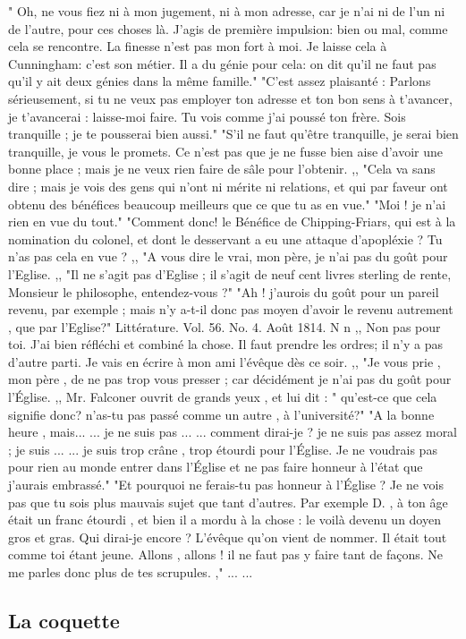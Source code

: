 " Oh, ne vous fiez ni à mon jugement, ni à mon adresse, car je n'ai ni de l'un ni de l'autre, pour ces choses là. J'agis de première impulsion: bien ou mal, comme cela se rencontre. La finesse n'est pas mon fort à moi. Je laisse cela à Cunningham: c'est son métier. Il a du génie pour cela: on dit qu'il ne faut pas qu'il y ait deux génies dans la même famille."
\setcounter{page}{525} "C'est assez plaisanté : Parlons sérieusement, si tu ne veux pas employer ton adresse et ton bon sens à t'avancer, je t'avancerai : laisse-moi faire. Tu vois comme j'ai poussé ton frère. Sois tranquille ; je te pousserai bien aussi."
"S'il ne faut qu'être tranquille, je serai bien tranquille, je vous le promets. Ce n'est pas que je ne fusse bien aise d'avoir une bonne place ; mais je ne veux rien faire de sâle pour l'obtenir. ,,
"Cela va sans dire ; mais je vois des gens qui n'ont ni mérite ni relations, et qui par faveur ont obtenu des bénéfices beaucoup meilleurs que ce que tu as en vue."
"Moi ! je n'ai rien en vue du tout."
"Comment donc! le Bénéfice de Chipping-Friars, qui est à la nomination du colonel, et dont le desservant a eu une attaque d'apopléxie ? Tu n'as pas cela en vue ? ,,
"A vous dire le vrai, mon père, je n'ai pas du goût pour l'Eglise. ,,
"Il ne s'agit pas d'Eglise ; il s'agit de neuf cent livres sterling de rente, Monsieur le philosophe, entendez-vous ?"
"Ah ! j'aurois du goût pour un pareil revenu, par exemple ; mais n'y a-t-il donc pas moyen d'avoir le revenu autrement , que par l'Eglise?"
Littérature. Vol. 56. No. 4. Août 1814.
N n\setcounter{page}{526} ,, Non pas pour toi. J'ai bien réfléchi et combiné la chose. Il faut prendre les ordres; il n'y a pas d'autre parti. Je vais en écrire à mon ami l'évêque dès ce soir. ,,
"Je vous prie , mon père , de ne pas trop vous presser ; car décidément je n'ai pas du goût pour l'Église. ,,
Mr. Falconer ouvrit de grands yeux , et lui dit : " qu'est-ce que cela signifie donc? n'as-tu pas passé comme un autre , à l'université?"
"A la bonne heure , mais... ... je ne suis pas ... ... comment dirai-je ? je ne suis pas assez moral ; je suis ... ... je suis trop crâne , trop étourdi pour l'Église. Je ne voudrais pas pour rien au monde entrer dans l'Église et ne pas faire honneur à l'état que j'aurais embrassé."
"Et pourquoi ne ferais-tu pas honneur à l'Église ? Je ne vois pas que tu sois plus mauvais sujet que tant d'autres. Par exemple D. , à ton âge était un franc étourdi , et bien il a mordu à la chose : le voilà devenu un doyen gros et gras. Qui dirai-je encore ? L'évêque qu'on vient de nommer. Il était tout comme toi étant jeune. Allons , allons ! il ne faut pas y faire tant de façons. Ne me parles donc plus de tes scrupules. ," ... ...\setcounter{page}{527} \subsection{La coquette}
